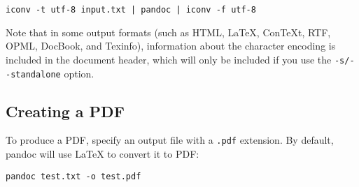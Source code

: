 \documentclass[]{article}
\begin{document}
\begin{verbatim}
iconv -t utf-8 input.txt | pandoc | iconv -f utf-8
\end{verbatim}

Note that in some output formats (such as HTML, LaTeX, ConTeXt, RTF,
OPML, DocBook, and Texinfo), information about the character encoding is
included in the document header, which will only be included if you use
the \texttt{-s/-\/-standalone} option.

\hypertarget{creating-a-pdf}{\subsection{Creating a
PDF}\label{creating-a-pdf}}

To produce a PDF, specify an output file with a \texttt{.pdf} extension.
By default, pandoc will use LaTeX to convert it to PDF:

\begin{verbatim}
pandoc test.txt -o test.pdf
\end{verbatim}
\end{document}
